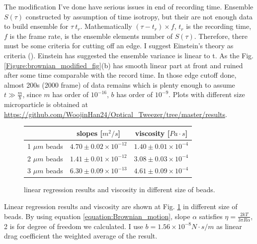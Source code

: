 \documentclass{article}
\begin{document}
The modification I've done have serious issues in end of recording time.
Ensemble $S(\tau)$ constructed by assumption of time isotropy, but their are not enough data to build ensemble for $\tau ~ t_r$.
Mathematically $(\tau-t_r)\times f$, $t_r$ is the recording time, $f$ is the frame rate, is the ensemble elements number of $S(\tau)$.
Therefore, there must be some criteria for cutting off an edge.
I suggest Einstein's theory as criteria (\cite{Brownian_motion_1}).
Einstein has suggested the ensemble variance is linear to t.
As the Fig. \ref{Figure:brownian_modified_fig}(b) has smooth linear part at front and ruined after some time comparable with the record time.
In those edge cutoff done, almost 200s (2000 frame) of data remains which is plenty enough to assume $t \gg \frac{m}{b}$, since $m$ has order of $10^{-16}$, $b$ has order of $10^{-9}$.
Plots with different size microparticle is obtained at \url{https://github.com/WoojinHan24/Optical_Tweezer/tree/master/results}.
\begin{figure}[h]
    \centering
    \begin{tabular}{|c| c| c|}
            & slopes [$m^2/s$]& viscosity [$Pa \cdot s$]\\
        \hline
        1 $\mu m$ beads & $4.70\pm 0.02 \times 10^{-12}$ & $1.40 \pm 0.01 \times 10^{-4}$\\
        2 $\mu m$ beads & $1.41\pm 0.01 \times 10^{-12}$ & $3.08 \pm 0.03 \times 10^{-4}$\\
        3 $\mu m$ beads & $6.30\pm0.09 \times 10^{-13}$ & $4.61 \pm 0.09 \times 10^{-4}$
        
    \end{tabular}
    \caption{linear regression results and viscosity in different size of beads.}
    \label{Figure:linear regression results}
\end{figure}

Linear regression results and viscosity are shown at Fig. \ref{Figure:linear regression results} in different size of beads.
By using equation \ref{equation:Brownian_motion}, slope $\alpha$ satisfies $\eta = \frac{2kT}{3\pi R \alpha}$, 2 is for degree of freedom we calculated.
I use $b = 1.56 \times 10^{-8} N\cdot s/m$ as linear drag coefficient the weighted average of the result.


\label{results:viscosity}
\label{results:modified_brownian_analysis}
\end{document}
